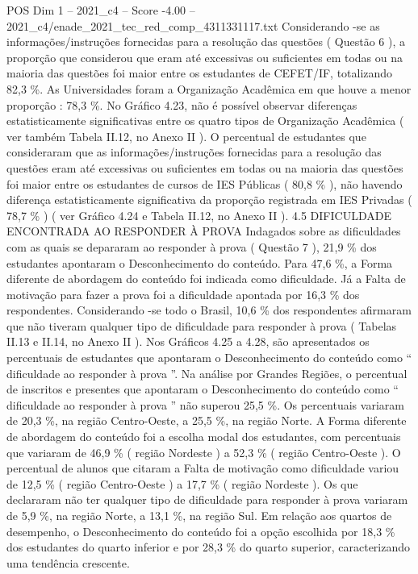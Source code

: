 \begin{textsample}{POS Dim 1 – 2021\_c4 – Score -4.00 – 2021\_c4/enade\_2021\_tec\_red\_comp\_4311331117.txt}
Considerando -se as informações/instruções fornecidas para a resolução das questões ( Questão 6 ), a proporção que considerou que eram até excessivas ou suficientes em todas ou na maioria das questões foi maior entre os estudantes de CEFET/IF, totalizando 82,3 \%.
As Universidades foram a Organização Acadêmica em que houve a menor proporção : 78,3 \%.
No Gráfico 4.23, não é possível observar diferenças estatisticamente significativas entre os quatro tipos de Organização Acadêmica ( ver também Tabela II.12, no Anexo II ).
O percentual de estudantes que consideraram que as informações/instruções fornecidas para a resolução das questões eram até excessivas ou suficientes em todas ou na maioria das questões foi maior entre os estudantes de cursos de IES Públicas ( 80,8 \% ), não havendo diferença estatisticamente significativa da proporção registrada em IES Privadas ( 78,7 \% ) ( ver Gráfico 4.24 e Tabela II.12, no Anexo II ). 4.5 DIFICULDADE ENCONTRADA AO RESPONDER À PROVA Indagados sobre as dificuldades com as quais se depararam ao responder à prova ( Questão 7 ), 21,9 \% dos estudantes apontaram o Desconhecimento do conteúdo.
Para 47,6 \%, a Forma diferente de abordagem do conteúdo foi indicada como dificuldade.
Já a Falta de motivação para fazer a prova foi a dificuldade apontada por 16,3 \% dos respondentes.
Considerando -se todo o Brasil, 10,6 \% dos respondentes afirmaram que não tiveram qualquer tipo de dificuldade para responder à prova ( Tabelas II.13 e II.14, no Anexo II ).
Nos Gráficos 4.25 a 4.28, são apresentados os percentuais de estudantes que apontaram o Desconhecimento do conteúdo como “ dificuldade ao responder à prova ”.
Na análise por Grandes Regiões, o percentual de inscritos e presentes que apontaram o Desconhecimento do conteúdo como “ dificuldade ao responder à prova ” não superou 25,5 \%.
Os percentuais variaram de 20,3 \%, na região Centro-Oeste, a 25,5 \%, na região Norte.
A Forma diferente de abordagem do conteúdo foi a escolha modal dos estudantes, com percentuais que variaram de 46,9 \% ( região Nordeste ) a 52,3 \% ( região Centro-Oeste ).
O percentual de alunos que citaram a Falta de motivação como dificuldade variou de 12,5 \% ( região Centro-Oeste ) a 17,7 \% ( região Nordeste ).
Os que declararam não ter qualquer tipo de dificuldade para responder à prova variaram de 5,9 \%, na região Norte, a 13,1 \%, na região Sul.
Em relação aos quartos de desempenho, o Desconhecimento do conteúdo foi a opção escolhida por 18,3 \% dos estudantes do quarto inferior e por 28,3 \% do quarto superior, caracterizando uma tendência crescente.

\end{textsample}
